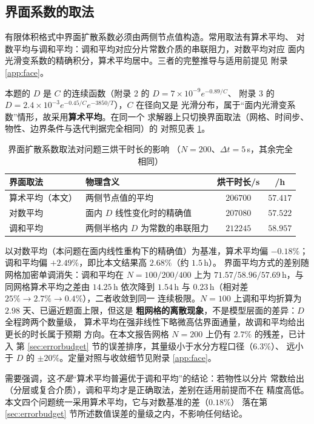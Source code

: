 \documentclass[12pt,a4paper,fontset=none]{ctexart}
\begin{document}
\subsection{界面系数的取法}
\label{sec:face-avg}

有限体积格式中界面扩散系数必须由两侧节点值构造。常用取法有算术平均、
对数平均与调和平均：调和平均对应分片常数介质的串联阻力，对数平均对应
面内光滑变系数的精确积分，算术平均居中。三者的完整推导与适用前提见
附录 \ref{app:face}。

本题的 $D$ 是 $C$ 的连续函数（附录 2 的 $D=7\times10^{-9}e^{-0.89/C}$、
附录 3 的 $D=2.4\times10^{-3}e^{-0.45/C}e^{-3850/T}$），$C$ 在径向又是
光滑分布，属于``面内光滑变系数''情形，故采用\textbf{算术平均}。在同一个
求解器上只切换界面取法（网格、时间步、物性、边界条件与迭代判据完全相同）的
对照见表 \ref{tab:face-mean}。

\begin{table}[htbp]
  \centering
  \caption{界面扩散系数取法对问题三烘干时长的影响
    （$N=200$、$\Delta t=5$\,s，其余完全相同）}
  \label{tab:face-mean}
  \small
  \begin{tabular}{lp{5.9cm}cc}
    \toprule
    界面取法 & 物理含义 & 烘干时长/s & /h \\
    \midrule
    算术平均（本文） & 两侧节点值的平均 & $206700$ & $57.417$ \\
    对数平均 & 面内 $D$ 线性变化时的精确值 & $207080$ & $57.522$ \\
    调和平均 & 两侧半格内 $D$ 为常数的串联阻力 & $212245$ & $58.957$ \\
    \bottomrule
  \end{tabular}
\end{table}

以对数平均（本问题在面内线性重构下的精确值）为基准，算术平均偏 $-0.18\%$；
调和平均偏 $+2.49\%$，即比本文结果高 $2.68\%$（约 $1.5$\,h）。
界面平均方式的差别随网格加密单调消失：调和平均在 $N=100/200/400$ 上为
$71.57/58.96/57.69$\,h，与同网格算术平均之差由 $14.25$\,h 依次降到
$1.54$\,h 与 $0.23$\,h（相对差 $25\%\to2.7\%\to0.4\%$），二者收敛到同一
连续极限。$N=100$ 上调和平均折算为 $2.98$ 天、已逼近题面上限，但这是
\textbf{粗网格的离散现象}，不是模型层面的差异：$D$ 全程跨两个数量级，
算术平均在强非线性下略微高估界面通量，故调和平均给出更长的时长属于预期
方向。在本文报告网格 $N=200$ 上仍有 $2.7\%$ 的残差，已计入
第 \ref{sec:errorbudget} 节的误差排序，其量级小于水分方程口径（$6.3\%$）、
远小于 $D$ 的 $\pm20\%$。定量对照与收敛细节见附录 \ref{app:face}。

需要强调，这\emph{不是}“算术平均普遍优于调和平均”的结论：若物性以分片
常数给出（分层或复合介质），调和平均才是正确取法，差别在适用前提而不在
精度高低。本文四个问题统一采用算术平均，它与对数基准的差（$0.18\%$）
落在第 \ref{sec:errorbudget} 节所述数值误差的量级之内，不影响任何结论。
\end{document}

